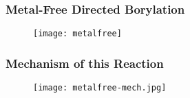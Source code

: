 \begin{frame}
	\frametitle{Metal-Free Directed  Borylation}
	\begin{figure}
		\centering
		\texttt{[image: metalfree]}
		\label{fig:metalfree}
	\end{figure}
	
\end{frame}

\begin{frame}
	\frametitle{Mechanism of this Reaction}
	\begin{figure}
		\centering
		\texttt{[image: metalfree-mech.jpg]}
		\label{fig:metalfree-mech}
	\end{figure}
	
\end{frame}